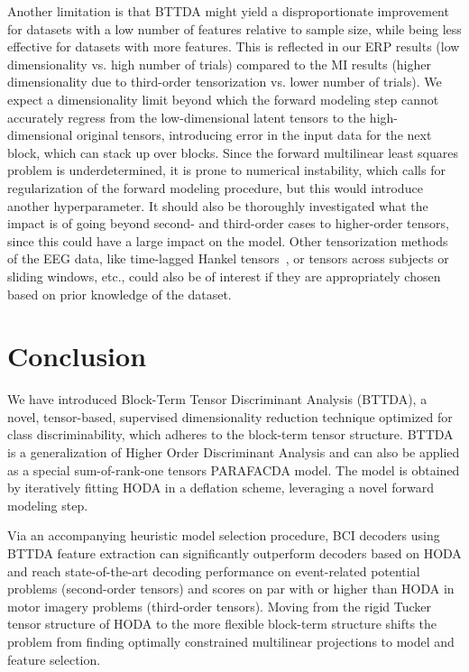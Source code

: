 Another limitation is that BTTDA might yield a disproportionate
improvement for datasets with a low number of features relative to sample size,
while being less effective for datasets with more features.
This is reflected in our ERP results (low dimensionality vs. high number of
trials) compared to the MI results (higher dimensionality due to third-order
tensorization vs. lower number of trials).
We expect a dimensionality limit beyond which the forward modeling step cannot
accurately regress from the low-dimensional latent tensors to the high-
dimensional original tensors, introducing
error in the input data for the next block, which can stack up over blocks.
Since the forward multilinear least squares problem is underdetermined, it is
prone to numerical instability, which calls for regularization of the forward
modeling procedure, but this would introduce another hyperparameter.
It should also be thoroughly investigated what the impact is of going beyond
second- and third-order cases to higher-order tensors, since this could have a
large impact on the model.
Other tensorization methods of the EEG data, like time-lagged Hankel
tensors~\cite{Papy2005}, or tensors across subjects or sliding windows, etc.,
could also be of interest if they are appropriately chosen based on prior
knowledge of the dataset.

\section{Conclusion}

We have introduced Block-Term Tensor Discriminant Analysis (BTTDA), a novel,
tensor-based, supervised dimensionality reduction technique optimized for class
discriminability, which adheres to the block-term tensor structure.
BTTDA is a generalization of Higher Order Discriminant Analysis and can also be
applied as a special sum-of-rank-one tensors PARAFACDA model.
The model is obtained by iteratively fitting HODA in a deflation scheme,
leveraging a novel forward modeling step.

Via an accompanying heuristic model selection procedure, BCI decoders using BTTDA
feature extraction can significantly outperform decoders based on HODA and
reach state-of-the-art decoding performance on event-related potential
problems (second-order tensors) and scores on par with or higher than HODA in motor
imagery problems (third-order tensors).
Moving from the rigid Tucker tensor structure of HODA to the more flexible
block-term structure shifts the problem from finding optimally constrained
multilinear projections to model and feature selection.


